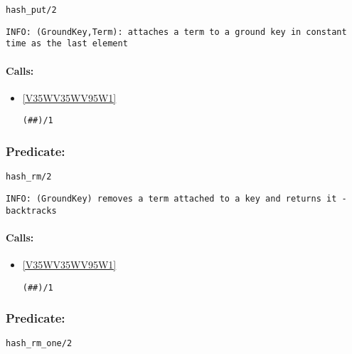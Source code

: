 \begin{verbatim}
hash_put/2
\end{verbatim}

{\small \begin{verbatim}
INFO: (GroundKey,Term): attaches a term to a ground key in constant time as the last element

\end{verbatim}}
\paragraph{Calls:} 
\begin{itemize}
\item \ref{V35WV35WV95W1} 
\begin{verbatim}
(##)/1
\end{verbatim}

\end{itemize}

\subsubsection{Predicate:} \label{hashV95WrmV95W2}

\begin{verbatim}
hash_rm/2
\end{verbatim}

{\small \begin{verbatim}
INFO: (GroundKey) removes a term attached to a key and returns it - backtracks

\end{verbatim}}
\paragraph{Calls:} 
\begin{itemize}
\item \ref{V35WV35WV95W1} 
\begin{verbatim}
(##)/1
\end{verbatim}

\end{itemize}

\subsubsection{Predicate:} \label{hashV95WrmV95WoneV95W2}

\begin{verbatim}
hash_rm_one/2
\end{verbatim}


